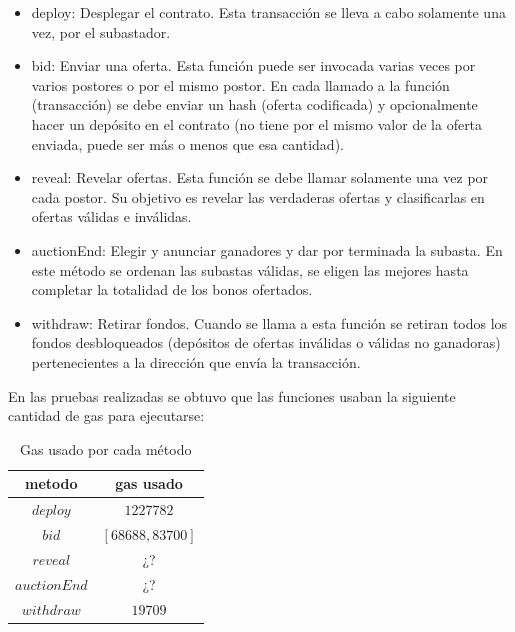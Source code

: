   
        \begin{itemize}
          \item deploy: Desplegar el contrato. Esta transacción se lleva a cabo solamente una vez, por el 
          subastador.
          \item bid: Enviar una oferta. Esta función puede ser invocada varias veces por varios postores o por
          el mismo postor. En cada llamado a la función (transacción) se debe enviar un hash (oferta codificada)
          y opcionalmente hacer un depósito en el contrato (no tiene por el mismo valor de la oferta enviada,
          puede ser más o menos que esa cantidad).
          \item reveal: Revelar ofertas. Esta función se debe llamar solamente una vez por cada postor. Su
          objetivo es revelar las verdaderas ofertas y clasificarlas en ofertas válidas e inválidas.
          \item auctionEnd: Elegir y anunciar ganadores y dar por terminada la subasta. En este método se
          ordenan las subastas válidas, se eligen las mejores hasta completar la totalidad de los bonos
          ofertados.
          \item withdraw: Retirar fondos. Cuando se llama a esta función se retiran todos los fondos 
          desbloqueados (depósitos de ofertas inválidas o válidas no ganadoras) pertenecientes a la dirección 
          que envía la transacción.
        \end{itemize}
  
        En las pruebas realizadas se obtuvo que las funciones usaban la siguiente cantidad de gas para 
        ejecutarse:
  
        \begin{table}[h!]
          \centering
          \begin{tabular}{|c|c|} \hline
            metodo        & gas usado        \\ \hline
            $deploy$      & $1227782$        \\ \hline
            $bid$         & $[68688, 83700]$ \\ \hline
            $reveal$      & ¿?         \\ \hline
            $auctionEnd$  & ¿?         \\ \hline
            $withdraw$    & $19709$          \\ \hline
          \end{tabular}
          \caption{Gas usado por cada método}
          \label{gas_used}
        \end{table}
  
